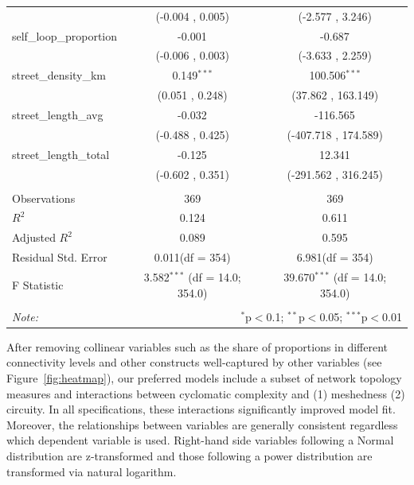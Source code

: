 \documentclass[
  10pt,
]{article}
\begin{document}
\begin{table}[!htbp]
\begin{tabular}{@{\extracolsep{5pt}}lcc}
  & (-0.004 , 0.005) & (-2.577 , 3.246) \\
 self\_loop\_proportion & -0.001$^{}$ & -0.687$^{}$ \\
  & (-0.006 , 0.003) & (-3.633 , 2.259) \\
 street\_density\_km & 0.149$^{***}$ & 100.506$^{***}$ \\
  & (0.051 , 0.248) & (37.862 , 163.149) \\
 street\_length\_avg & -0.032$^{}$ & -116.565$^{}$ \\
  & (-0.488 , 0.425) & (-407.718 , 174.589) \\
 street\_length\_total & -0.125$^{}$ & 12.341$^{}$ \\
  & (-0.602 , 0.351) & (-291.562 , 316.245) \\
\hline \\[-1.8ex]
 Observations & 369 & 369 \\
 $R^2$ & 0.124 & 0.611 \\
 Adjusted $R^2$ & 0.089 & 0.595 \\
 Residual Std. Error & 0.011(df = 354) & 6.981(df = 354)  \\
 F Statistic & 3.582$^{***}$ (df = 14.0; 354.0) & 39.670$^{***}$ (df = 14.0; 354.0) \\
\hline
\hline \\[-1.8ex]
\textit{Note:} & \multicolumn{2}{r}{$^{*}$p$<$0.1; $^{**}$p$<$0.05; $^{***}$p$<$0.01} \\
\end{tabular}
\end{table}

After removing collinear variables such as the share of proportions in
different connectivity levels and other constructs well-captured by
other variables (see Figure~\ref{fig:heatmap}), our preferred models
include a subset of network topology measures and interactions between
cyclomatic complexity and (1) meshedness (2) circuity. In all
specifications, these interactions significantly improved model fit.
Moreover, the relationships between variables are generally consistent
regardless which dependent variable is used. Right-hand side variables
following a Normal distribution are z-transformed and those following a
power distribution are transformed via natural logarithm.
\end{document}
